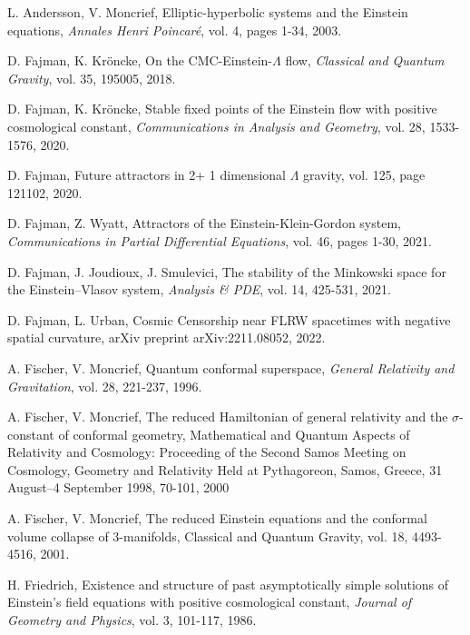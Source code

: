 \documentclass{amsart}
\begin{document}
\begin{thebibliography}{}
 L. Andersson, V. Moncrief, Elliptic-hyperbolic systems and the Einstein equations, \textit{Annales Henri Poincar\'e}, vol. 4, pages 1-34, 2003.

 D. Fajman, K. Kr{\"o}ncke, On the CMC-Einstein-$\Lambda$ flow, \textit{Classical and Quantum Gravity}, vol. 35, 195005, 2018.  

 D. Fajman, K. Kr{\"o}ncke, Stable fixed points of the Einstein flow with positive cosmological constant, \textit{Communications in Analysis and Geometry}, vol. 28, 1533-1576, 2020. 


 D. Fajman, Future attractors in 2+ 1 dimensional $\Lambda$ gravity, vol. 125, page 121102, 2020.



 D. Fajman, Z. Wyatt, Attractors of the Einstein-Klein-Gordon system, \textit{Communications in Partial Differential Equations}, vol. 46, pages 1-30, 2021.  

 D. Fajman, J. Joudioux, J. Smulevici, The stability of the Minkowski space for the Einstein--Vlasov system, \textit{Analysis \& PDE}, vol. 14, 425-531, 2021.  

 D. Fajman, L. Urban, Cosmic Censorship near FLRW spacetimes with negative spatial curvature, arXiv preprint arXiv:2211.08052, 2022.  




 A. Fischer, V. Moncrief, Quantum conformal superspace, \textit{General Relativity and Gravitation}, vol. 28, 221-237, 1996.



 A. Fischer, V. Moncrief, The reduced Hamiltonian of general relativity and the $\sigma$-constant of conformal geometry, Mathematical and Quantum Aspects of Relativity and Cosmology: Proceeding of the Second Samos Meeting on Cosmology, Geometry and Relativity Held at Pythagoreon, Samos, Greece, 31 August--4 September 1998, 70-101, 2000   

 A. Fischer, V. Moncrief, The reduced Einstein equations and the conformal volume collapse of 3-manifolds, Classical and Quantum Gravity, vol. 18, 4493-4516, 2001.   




 H. Friedrich, Existence and structure of past asymptotically simple solutions of Einstein's field equations with positive cosmological constant, \textit{Journal of Geometry and Physics}, vol. 3, 101-117, 1986. 






\end{thebibliography}
\end{document}
